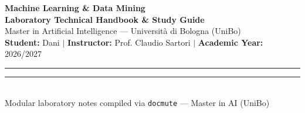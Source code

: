 \documentclass[11pt,a4paper]{article}
\let\oldtexttt\texttt
\renewcommand{\texttt}[1]{{\color{codebase}\oldtexttt{#1}}}
\begin{document}
\thispagestyle{plain}

\begin{center}
    \vspace*{0.2cm}
    {\Huge\bfseries\color{blue!80!black} Machine Learning \& Data Mining}\\[0.4em]
    {\LARGE\textbf{Laboratory Technical Handbook \& Study Guide}}\\[0.8em]
    {\large Master in Artificial Intelligence --- Università di Bologna (UniBo)}\\[0.6em]
    \small
    \textbf{Student:} Dani \quad $\vert$ \quad \textbf{Instructor:} Prof. Claudio Sartori \quad $\vert$ \quad \textbf{Academic Year:} 2026/2027
\end{center}

\vspace{0.8em}
\hrule
\vspace{1.2em}

{
    \hypersetup{linkcolor=blue!75!black}
    \setcounter{tocdepth}{2}
    \small
    \tableofcontents
}

\vfill
\begin{center}
    \footnotesize\color{gray}
    \rule{0.4\textwidth}{0.4pt}\\[0.4em]
    Modular laboratory notes compiled via \texttt{docmute} --- Master in AI (UniBo)
\end{center}
\newpage

\setcounter{section}{0}


% 

\newpage

\end{document}
